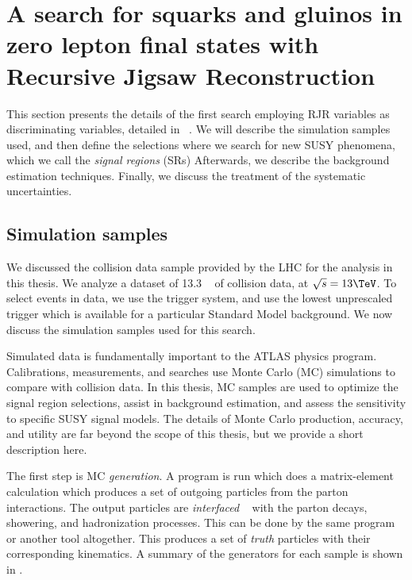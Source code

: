 

\chapter[A search for squarks and gluinos in zero lepton final states with Recursive Jigsaw Reconstruction][Top of Page Title]{A search for squarks and gluinos in zero lepton final states with Recursive Jigsaw Reconstruction}

This section presents the details of the first search employing RJR variables as discriminating variables, detailed in ~\cite{ATLAS-CONF-2016-078}.
We will describe the simulation samples used, and then define the selections where we search for new SUSY phenomena, which we call the \textit{signal regions} (SRs)
Afterwards, we describe the background estimation techniques.
Finally, we discuss the treatment of the systematic uncertainties.

\section{Simulation samples}

We discussed the collision data sample provided by the LHC for the analysis in this thesis.
We analyze a dataset of 13.3 \ifb~ of collision data, at $\sqrt{s} = 13 \TeV$.
To select events in data, we use the trigger system, and use the lowest unprescaled trigger which is available for a particular Standard Model background.
We now discuss the simulation samples used for this search.

Simulated data is fundamentally important to the ATLAS physics program.
Calibrations, measurements, and searches use Monte Carlo (MC) simulations to compare with collision data.
In this thesis, MC samples are used to optimize the signal region selections, assist in background estimation, and assess the sensitivity to specific SUSY signal models.
The details of Monte Carlo production, accuracy, and utility are far beyond the scope of this thesis, but we provide a short description here.

The first step is MC \textit{generation}.
A program is run which does a matrix-element calculation which produces a set of outgoing particles from the parton interactions.
The output particles are \textit{interfaced} ~\cite{Mangano:2006rw} with the parton decays, showering, and hadronization processes.
This can be done by the same program or another tool altogether.
This produces a set of \textit{truth} particles with their corresponding kinematics.
A summary of the generators for each sample is shown in .

